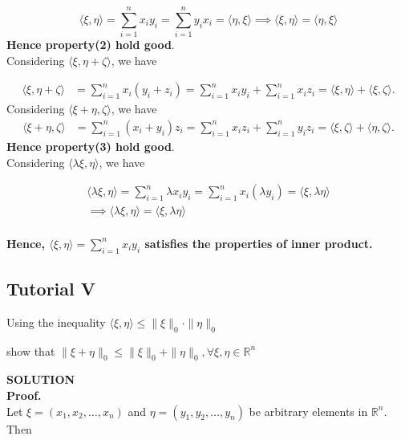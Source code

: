 \documentclass{article}
\begin{document}
$$
\langle\xi, \eta\rangle=\sum_{i=1}^{n} x_{i} y_{i}=\sum_{i=1}^{n} y_{i} x_{i}=\langle\eta, \xi\rangle \implies \langle\xi, \eta\rangle=\langle\eta, \xi\rangle$$
\textbf{Hence property(2) hold good}.\\
\newpage
Considering $\langle\xi, \eta+\zeta\rangle$, we have

$$
\begin{aligned}
\langle\xi, \eta+\zeta\rangle & =\sum_{i=1}^{n} x_{i}\left(y_{i}+z_{i}\right)=\sum_{i=1}^{n} x_{i} y_{i}+\sum_{i=1}^{n} x_{i} z_{i} =\langle\xi, \eta\rangle+\langle\xi, \zeta\rangle .
\end{aligned}
$$
Considering $\langle\xi+\eta, \zeta\rangle$, we have
$$
\begin{aligned}
\langle\xi+\eta, \zeta\rangle & =\sum_{i=1}^{n}\left(x_{i}+y_{i}\right) z_{i}=\sum_{i=1}^{n} x_{i} z_{i}+\sum_{i=1}^{n} y_{i} z_{i}  =\langle\xi, \zeta\rangle+\langle\eta, \zeta\rangle .
\end{aligned}
$$
\textbf{Hence property(3) hold good}.\\

Considering $\langle\lambda \xi, \eta\rangle$, we have

$$
\begin{align}
\langle\lambda \xi, \eta\rangle=\sum_{i=1}^{n} \lambda x_{i} y_{i}=\sum_{i=1}^{n} x_{i}\left(\lambda y_{i}\right)=\langle\xi, \lambda \eta\rangle\\
\implies \langle\lambda \xi, \eta\rangle=\langle\xi, \lambda \eta\rangle 
\end{align}
$$\\

\textbf{Hence, $\langle\xi, \eta\rangle=\sum_{i=1}^{n} x_{i} y_{i}$ satisfies the properties of inner product.}\\

\subsection{Tutorial V}

Using the inequality  $
\langle\xi, \eta\rangle \leq\|\xi\|_{0} \cdot\|\eta\|_{0}
$

\begin{center}
show that   $\|\xi+\eta\|_{0} \leq\|\xi\|_{0}+\|\eta\|_{0}, \forall \xi, \eta \in \mathbb{R}^{n}$
\end{center}

\textbf{SOLUTION}\\
\textbf{Proof.} \\
Let $\xi=\left(x_{1}, x_{2}, \ldots, x_{n}\right)$ and $\eta=\left(y_{1}, y_{2}, \ldots, y_{n}\right)$ be arbitrary elements in $\mathbb{R}^{n}$. Then
\end{document}
